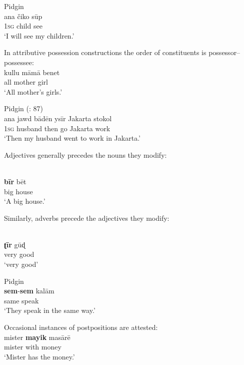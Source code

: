 \documentclass[output=paper]{langsci/langscibook}
\begin{document}
\ex {} Pidgin  \citep[133]{Avram2017article}\\
\gll     ana čiko sūp\\
         1\textsc{sg} child see\\
\glt       `I will see my children.'                                        
\z                                             
\z

In attributive possession constructions the order of constituents is possessor–possessee:                                                                                        
\ea
\ea {} \citep[198]{Bizri2010} \\
\gll     kullu māmā benet \\
         all mother girl    \\
\glt `All mother’s girls.'

\ex {} Pidgin  (\citealt{Næss2008}: 87)\\
\gll     ana jawd bādēn ysīr Jakarta stokol\\
         1\textsc{sg} husband then go Jakarta work\\
\glt       `Then my husband went to work in Jakarta.' 
\z
\z

Adjectives generally precedes the nouns they modify:

\ea
{  \citep[119]{Bizri2010}}\\
\gll   \textbf{bī}\textbf{r} bēt\\
       big house\\
\glt     `A big house.'
\z

Similarly, adverbs precede the adjectives they modify:

\ea
\ea {} \citep[119]{Bizri2010}\\
\gll     \textbf{ʈīr} gūɖ\\
         very good\\
\glt       `very good'

\ex
{} Pidgin  \citep[25]{Avram2014Pidgin}\\
\gll     \textbf{sem}-\textbf{sem} kalām\\
         same speak \\
\glt       `They speak in the same way.'
 \z
 \z

  Occasional instances of postpositions are attested:
\ea
\ea {} \citep[132]{Bizri2010}\\
\gll     mister \textbf{mayik} masārē\\
         mister with money\\
\glt    `Mister has the money.'
\end{document}
